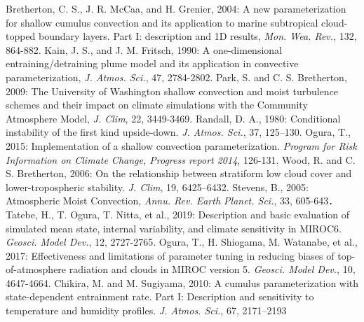 \documentclass[platex, dvipdfmx]{jsarticle}
\begin{document}
\begin{thebibliography}{99}
     Bretherton, C. S., J. R. McCaa, and H. Grenier, 2004: 
        A new parameterization for shallow cumulus convection and its application to marine subtropical cloud-topped boundary layers. 
        Part I: description and 1D results, \textit{Mon. Wea. Rev.}, 132, 864-882.
    Kain, J. S., and J. M. Fritsch, 1990: 
        A one-dimensional entraining/detraining plume model and its application in convective parameterization,
        \textit{J. Atmos. Sci.}, 47, 2784-2802.
     Park, S. and C. S. Bretherton, 2009: 
        The University of Washington shallow convection and moist turbulence schemes and their impact on 
        climate simulations with the Community Atmosphere Model, \textit{J. Clim}, 22, 3449-3469.
     Randall, D. A., 1980: 
        Conditional instability of the first kind upside-down. \textit{J. Atmos. Sci.}, 37, 125–130.
     Ogura, T., 2015: 
        Implementation of a shallow convection parameterization. \textit{Program for Risk Information on Climate Change, 
        Progress report 2014}, 126-131.
     Wood, R. and C. S. Bretherton, 2006: 
        On the relationship between stratiform low cloud cover and lower-tropospheric stability. 
        \textit{J. Clim}, 19, 6425–6432.
     Stevens, B., 2005: 
        Atmospheric Moist Convection, \textit{Annu. Rev. Earth Planet. Sci.}, 33, 605-643．
     Tatebe, H., T. Ogura, T. Nitta, et al., 2019: 
        Description and basic evaluation of simulated mean state, internal variability, and climate sensitivity in MIROC6.
        \textit{Geosci. Model Dev.}, 12, 2727-2765.
     Ogura, T., H. Shiogama, M. Watanabe, et al., 2017:
        Effectiveness and limitations of parameter tuning in reducing biases of top-of-atmosphere radiation and clouds in MIROC version 5.
        \textit{Geosci. Model Dev.}, 10, 4647-4664.
    Chikira, M. and M. Sugiyama, 2010: 
        A cumulus parameterization with state-dependent entrainment rate. Part I: Description and sensitivity to temperature and humidity profiles.
        \textit{J. Atmos. Sci.}, 67, 2171–2193
\end{thebibliography}
\end{document}
